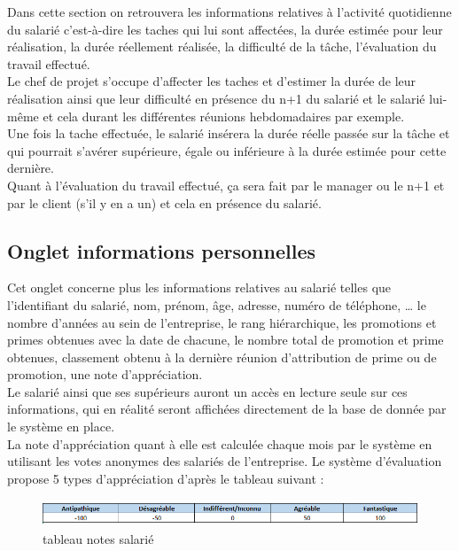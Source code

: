 Dans cette section on retrouvera les informations relatives à l’activité quotidienne du salarié c’est-à-dire les taches qui lui sont affectées, la durée estimée pour leur réalisation, la durée réellement réalisée, la difficulté de la tâche, l’évaluation du travail effectué.\\
Le chef de projet s’occupe d’affecter les taches et d’estimer la durée de leur réalisation ainsi que leur difficulté en présence du n+1 du salarié et le salarié lui-même et cela durant les différentes réunions hebdomadaires par exemple.\\
Une fois la tache effectuée, le salarié insérera la durée réelle passée sur la tâche et qui pourrait s'avérer supérieure, égale ou inférieure à la durée estimée pour cette dernière.\\
Quant à l’évaluation du travail effectué, ça sera fait par le manager ou le n+1 et par le client (s’il y en a un) et cela en présence du salarié.          

\subsection{Onglet informations personnelles}

Cet onglet concerne plus les informations relatives au salarié telles que l'identifiant du salarié, nom, prénom, âge, adresse, numéro de téléphone, … le nombre d’années au sein de l’entreprise, le rang hiérarchique, les promotions et primes obtenues avec la date de chacune, le nombre total de promotion et prime obtenues, classement obtenu à la dernière réunion d’attribution de prime ou de promotion, une note d’appréciation.\\


Le salarié ainsi que ses supérieurs auront un accès en lecture seule sur ces informations, qui en réalité seront affichées directement de la base de donnée par le système en place. \\
La note d’appréciation quant à elle est calculée chaque mois par le système en utilisant les votes anonymes des salariés de l’entreprise. Le système d’évaluation propose 5 types d’appréciation d’après le tableau suivant :    

\begin{figure}[!h]
\begin{center}
\includegraphics[height=0.8cm]{Conception_implementation/tableau_sym.png}
\end{center}
\caption{tableau notes salarié}
\end{figure}

